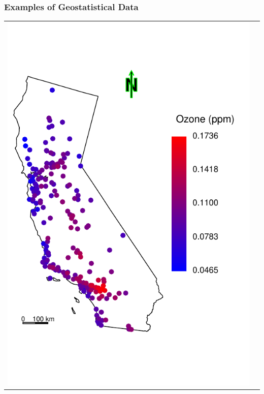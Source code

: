 \documentclass[mathserif,compress]{beamer}\usepackage{graphicx, color}
\makeatletter
\def\maxwidth{ %
  \ifdim\Gin@nat@width>\linewidth
    \linewidth
  \else
    \Gin@nat@width
  \fi
}
\newenvironment{knitrout}{}{} %
\makeatother
\begin{document}
\begin{frame} [fragile]
\frametitle{Examples of Geostatistical Data}


	\begin{tabular} {p{4.5cm} p{4.5cm}}

\begin{knitrout}\tiny
\definecolor{shadecolor}{rgb}{0.969, 0.969, 0.969}\color{fgcolor}

{\centering \includegraphics[width=\maxwidth]{figure/colorPointsCAOzone-plot} 

}




\end{knitrout}
\end{tabular}
\end{frame}
\end{document}
